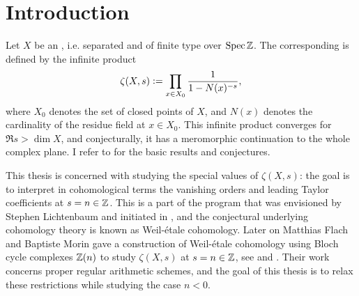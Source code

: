 \chapter*{Introduction}


\iffalse
\epigraph{\foreignlanguage{russian}{Господи, как мир волшебен,\\
Как всё в мире хорошо.\\
Я пою богам молебен,\\
Я стираюсь в порошок\\
Перед видом столь могучих,\\
Столь таинственных вещей,\\
Что проносятся на тучах\\
В образе мешка свечей.\\
Боже мой, всё в мире пышно,\\
Благолепно и умно.\\
Богу молятся неслышно\\
Море, лось, кувшин, гумно,\\
Свечка, всадник, человек...}}{\foreignlanguage{russian}{Александр Введенский, 1930-е}}
\fi

Let $X$ be an , i.e. separated and of finite type over
$\operatorname{Spec} \mathbb{Z}$. The corresponding  is defined by the infinite
product
$$\zeta (X,s) \mathrel{\mathop:}= \prod_{x\in X_0} \frac{1}{1 - N (x)^{-s}},$$
where $X_0$ denotes the set of closed points of $X$, and $N (x)$ denotes the
cardinality of the residue field at $x\in X_0$. This infinite product converges
for $\Re s > \dim X$, and conjecturally, it has a meromorphic continuation to
the whole complex plane. I refer to \cite{Serre-65} for the basic results and
conjectures.

This thesis is concerned with studying the special values of $\zeta (X,s)$: the
goal is to interpret in cohomological terms the vanishing orders and leading
Taylor coefficients at $s = n \in \mathbb{Z}$. This is a part of the program that was
envisioned by Stephen Lichtenbaum and initiated in
\cite{Lichtenbaum-05,Lichtenbaum-09-Euler,Lichtenbaum-09-number-rings}, and the
conjectural underlying cohomology theory is known as Weil-étale
cohomology. Later on Matthias Flach and Baptiste Morin gave a construction of
Weil-étale cohomology using Bloch cycle complexes $\mathbb{Z} (n)$ to study
$\zeta (X, s)$ at $s = n \in \mathbb{Z}$, see \cite{Morin-14} and
\cite{Flach-Morin-16}. Their work concerns proper regular arithmetic schemes,
and the goal of this thesis is to relax these restrictions while studying the
case $n < 0$.

